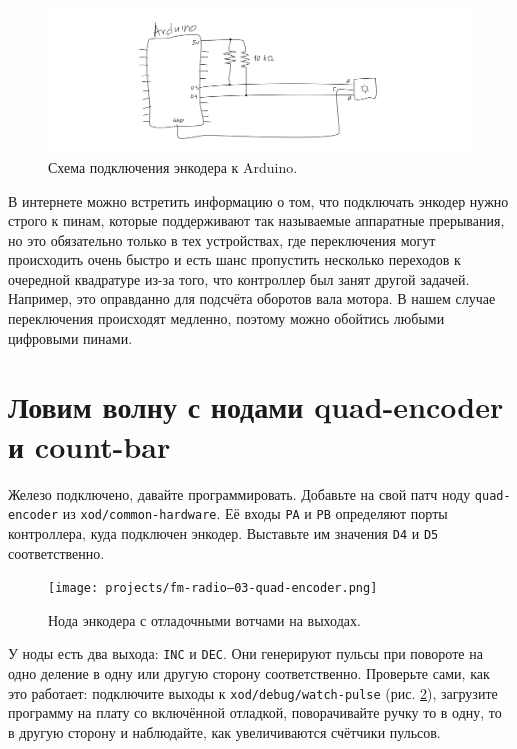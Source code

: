 \begin{figure}
  \centering
  \includegraphics{sketches/encoder-wiring}
  \caption{Схема подключения энкодера к Arduino.}
  \label{encoder-wiring}
\end{figure}

В интернете можно встретить информацию о том, что подключать энкодер нужно строго к пинам, которые поддерживают так называемые аппаратные прерывания, но это обязательно только в тех устройствах, где переключения могут происходить очень быстро и есть шанс пропустить несколько переходов к очередной квадратуре из-за того, что контроллер был занят другой задачей. Например, это оправданно для подсчёта оборотов вала мотора. В нашем случае переключения происходят медленно, поэтому можно обойтись любыми цифровыми пинами.

\section{Ловим волну с нодами quad-encoder и count-bar}

Железо подключено, давайте программировать. Добавьте на свой патч ноду \texttt{quad-encoder} из \texttt{xod/common-hardware}. Её входы \texttt{PA} и \texttt{PB} определяют порты контроллера, куда подключен энкодер. Выставьте им значения \texttt{D4} и \texttt{D5} соответственно.

\begin{figure}
  \centering
  \texttt{[image: projects/fm-radio--03-quad-encoder.png]}
  \caption{Нода энкодера с отладочными вотчами на выходах.}
  \label{patch:quad-enc}
\end{figure}

У ноды есть два выхода: \texttt{INC} и \texttt{DEC}. Они генерируют пульсы при повороте на одно деление в одну или другую сторону соответственно. Проверьте сами, как это работает: подключите выходы к \texttt{xod/debug/watch-pulse} (рис. \ref{patch:quad-enc}), загрузите программу на плату со включённой отладкой, поворачивайте ручку то в одну, то в другую сторону и наблюдайте, как увеличиваются счётчики пульсов.

